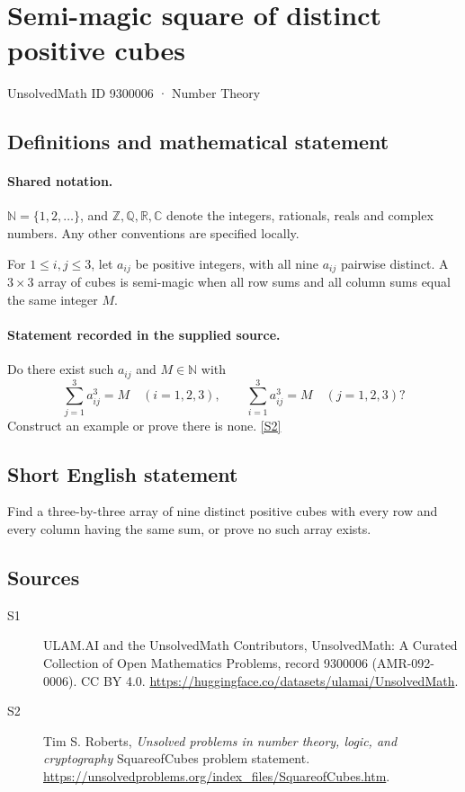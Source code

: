 \documentclass[11pt]{article}
\newcommand{\sref}[2]{\hyperlink{source:#1:#2}{[S#2]}}
\begin{document}
\setcounter{section}{9300005}
\section{Semi-magic square of distinct positive cubes}\label{9300006}
{\small\sffamily UnsolvedMath ID 9300006 · Number Theory}
\subsection{Definitions and mathematical statement}

\paragraph{Shared notation.}$\mathbb N=\{1,2,\ldots\}$, and $\mathbb Z,\mathbb Q,\mathbb R,\mathbb C$ denote the integers, rationals, reals and complex numbers. Any other conventions are specified locally.


For $1\le i,j\le3$, let $a_{ij}$ be positive integers, with all nine $a_{ij}$ pairwise distinct. A $3\times3$ array of cubes is semi-magic when all row sums and all column sums equal the same integer $M$.
\paragraph{Statement recorded in the supplied source.}
Do there exist such $a_{ij}$ and $M\in\mathbb N$ with
\[
\sum_{j=1}^{3}a_{ij}^{3}=M\quad(i=1,2,3),\qquad
\sum_{i=1}^{3}a_{ij}^{3}=M\quad(j=1,2,3)?
\]
Construct an example or prove there is none. \sref{9300006}{2}
\subsection{Short English statement}
Find a three-by-three array of nine distinct positive cubes with every row and every column having the same sum, or prove no such array exists.
\subsection{Sources}
\begin{description}
\item[\hypertarget{source:9300006:1}{S1}] ULAM.AI and the UnsolvedMath Contributors, UnsolvedMath: A Curated Collection of Open Mathematics Problems, record 9300006 (AMR-092-0006). CC BY 4.0. \url{https://huggingface.co/datasets/ulamai/UnsolvedMath}.
\item[\hypertarget{source:9300006:2}{S2}] Tim S. Roberts, \emph{Unsolved problems in number theory, logic, and cryptography} SquareofCubes problem statement. \url{https://unsolvedproblems.org/index_files/SquareofCubes.htm}.
\end{description}
\label{end:9300006}
\end{document}
